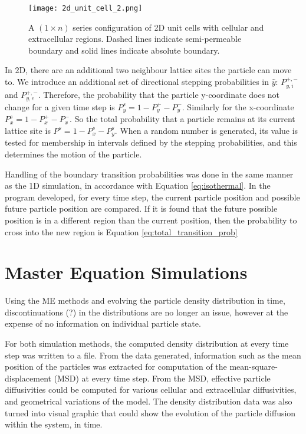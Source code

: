 	\begin{figure}[h]
		\centering
		\texttt{[image: 2d\_unit\_cell\_2.png]}
		\caption{A $ \left( 1 \times n \right) $ series configuration of 2D unit cells with cellular and extracellular regions. Dashed lines indicate semi-permeable boundary and solid lines indicate absolute boundary.}
		\label{fig:2d_unit_cell_2.png}
	\end{figure}
	
	In 2D, there are an additional two neighbour lattice sites the particle can move to. We introduce an additional set of directional stepping probabilities in $ \hat{y} $: $ P_{y,i}^{+,-} $ and $ P_{y,e}^{+,-} $. Therefore, the probability that the particle y-coordinate does not change for a given time step is $ P_{y}^s = 1 - P_{y}^{+} - P_{y}^{-}$. Similarly for the x-coordinate $ P_{x}^s = 1 - P_{x}^{+} - P_{x}^{-}$. So the total probability that a particle remains at its current lattice site is $ P^s = 1 - P_{x}^s - P_{y}^s$. When a random number is generated, its value is tested for membership in intervals defined by the stepping probabilities, and this determines the motion of the particle.
	
	Handling of the boundary transition probabilities was done in the same manner as the 1D simulation, in accordance with Equation \ref{eq:isothermal}. In the program developed, for every time step, the current particle position and possible future particle position are compared. If it is found that the future possible position is in a different region than the current position, then the probability to cross into the new region is Equation \ref{eq:total_transition_prob}

\section{Master Equation Simulations}

	
	Using the ME methods and evolving the particle density distribution in time, discontinuations (?) in the distributions are no longer an issue, however at the expense of no information on individual particle state.
	
	For both simulation methods, the computed density distribution at every time step was written to a file. From the data generated, information such as the mean position of the particles was extracted for computation of the mean-square-displacement (MSD) at every time step. From the MSD, effective particle diffusivities could be computed for various cellular and extracellular diffusivities, and geometrical variations of the model. The density distribution data was also turned into visual graphic that could show the evolution of the particle diffusion within the system, in time.
	
